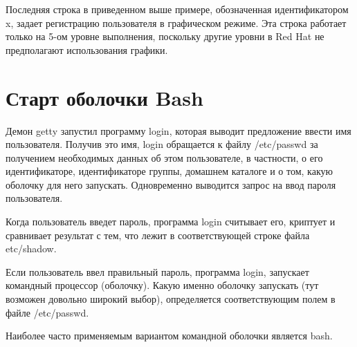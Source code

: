Последняя строка в приведенном выше примере, обозначенная идентификатором x, задает регистрацию пользователя в графическом режиме. Эта строка работает только на 5-ом уровне выполнения, поскольку другие уровни в Red Hat не предполагают использования графики.

\newpage
\section{Старт оболочки Bash}

Демон getty запустил программу login, которая выводит предложение ввести имя пользователя. Получив это имя, login обращается к файлу /etc/passwd за получением необходимых данных об этом пользователе, в частности, о его идентификаторе, идентификаторе группы, домашнем каталоге и о том, какую оболочку для него запускать. Одновременно выводится запрос на ввод пароля пользователя.

Когда пользователь введет пароль, программа login считывает его, криптует и сравнивает результат с тем, что лежит в соответствующей строке файла etc/shadow.

Если пользователь ввел правильный пароль, программа login, запускает командный процессор (оболочку). Какую именно оболочку запускать (тут возможен довольно широкий выбор), определяется соответствующим полем в файле /etc/passwd.

Наиболее часто применяемым вариантом командной оболочки является bash.